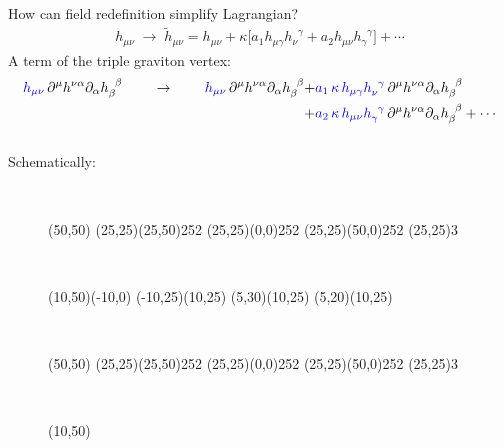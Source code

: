 \documentclass[aspectratio=169,usenames,dvipsnames]{beamer}
\begin{document}
\begin{frame}{\centering {}\\ How
    can field redefinition simplify Lagrangian?} \small
{}
\noindent\begin{align*}
      h_{\mu \nu} \; \rightarrow \; \tilde{h}_{\mu \nu}    = h_{\mu \nu} +\kappa \Big [
      a_{1} h_{\mu \gamma} h_{\nu}^{\;\; \gamma} +a_{2} h_{\mu \nu} h_{\gamma}^{\;\; \gamma} \Big ] + \cdots
                     \end{align*}\vspace{3mm}
    \small A term of the triple graviton vertex: 
    \begin{align*}
      {\color{blue} h_{\mu\nu}}\, \partial^{\mu} h^{\nu\alpha} \partial_{\alpha}h_{\beta}^{\;\;\beta} \qquad  \,\rightarrow\,\qquad {\color{blue} h_{\mu\nu}} \, \partial^{\mu} h^{\nu\alpha} \partial_{\alpha}h_{\beta}^{\;\;\beta} +& {\color{blue} a_{1}\, \kappa\, h_{\mu \gamma} h_{\nu}^{\;\; \gamma}} \, \partial^{\mu} h^{\nu\alpha} \partial_{\alpha}h_{\beta}^{\;\;\beta} \\
      +& {\color{blue} a_{2}\, \kappa\, h_{\mu \nu} h_{\gamma}^{\;\; \gamma}} \, \partial^{\mu} h^{\nu\alpha} \partial_{\alpha}h_{\beta}^{\;\;\beta} + \cdots 
    \end{align*}\\[2mm]
    \small Schematically:\\
\begin{figure}
  ~~~
  \begin{axopicture}(50,50)
    \DoublePhoton(25,25)(25,50){2}{5}{2}
    \DoublePhoton(25,25)(0,0){2}{5}{2}
    \DoublePhoton(25,25)(50,0){2}{5}{2}
    \Vertex(25,25){3}
  \end{axopicture}\hspace{2mm}
  ~~~
  \begin{axopicture}(10,50)(-10,0)
    \Line(-10,25)(10,25)
    \Line(5,30)(10,25)
    \Line(5,20)(10,25)
  \end{axopicture}\hspace{5mm}
  ~~~
  \begin{axopicture}(50,50)
    \DoublePhoton(25,25)(25,50){2}{5}{2}
    \DoublePhoton(25,25)(0,0){2}{5}{2}
    \DoublePhoton(25,25)(50,0){2}{5}{2}
    \Vertex(25,25){3}
  \end{axopicture}\hspace{3mm}
  ~~~
  \begin{axopicture}(10,50)

\end{axopicture}
\end{figure}
\end{frame}
\end{document}
